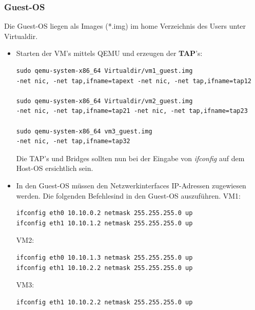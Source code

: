 \documentclass[a4,12pt]{scrartcl}
\begin{document}
\subsubsection{Guest-OS}
Die Guest-OS liegen als Images (*.img) im home Verzeichnis des Users unter Virtualdir. 
\begin{itemize}
\item Starten der VM's mittels QEMU und erzeugen der \textbf{TAP}'s:
\begin{lstlisting}
sudo qemu-system-x86_64 Virtualdir/vm1_guest.img 
-net nic, -net tap,ifname=tapext -net nic, -net tap,ifname=tap12

sudo qemu-system-x86_64 Virtualdir/vm2_guest.img 
-net nic, -net tap,ifname=tap21 -net nic, -net tap,ifname=tap23

sudo qemu-system-x86_64 vm3_guest.img 
-net nic, -net tap,ifname=tap32
\end{lstlisting}
Die TAP's und Bridges sollten nun bei der Eingabe von \textit{ifconfig} auf dem Host-OS ersichtlich sein.

\item In den Guest-OS müssen den Netzwerkinterfaces IP-Adressen zugewiesen werden. Die folgenden Befehlesind in den Guest-OS auszuführen.
\newline
VM1:
\begin{lstlisting}
ifconfig eth0 10.10.0.2 netmask 255.255.255.0 up
ifconfig eth1 10.10.1.2 netmask 255.255.255.0 up
\end{lstlisting}
VM2:
\begin{lstlisting}
ifconfig eth0 10.10.1.3 netmask 255.255.255.0 up
ifconfig eth1 10.10.2.2 netmask 255.255.255.0 up
\end{lstlisting}
VM3:
\begin{lstlisting}
ifconfig eth1 10.10.2.2 netmask 255.255.255.0 up

\end{lstlisting}


\end{itemize}
\end{document}
